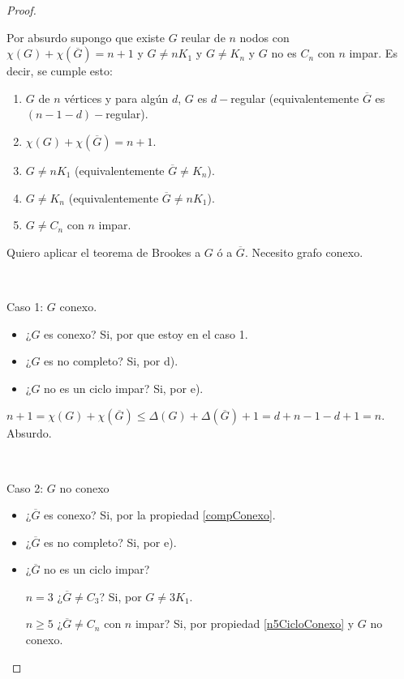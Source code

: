 \begin{proof}
	
	~

	Por absurdo supongo que existe $G$ reular de $n$ nodos con $\chi(G) + \chi(\overline{G}) = n + 1$ y $G \not= n K_1$ y $G \not= K_n$ y $G$ no es $C_n$ con $n$ impar. Es decir, se cumple esto:

	\begin{enumerate}[label=\alph*)]
		\item $G$ de $n$ vértices y para algún $d$, $G$ es $d-$regular (equivalentemente $\overline{G}$ es $(n - 1 - d)-$regular).
		\item $\chi(G) + \chi(\overline{G}) = n + 1$.
		\item $G \not= n K_1$ (equivalentemente $\overline{G} \not= K_n$).
		\item $G \not= K_n$ (equivalentemente $\overline{G} \not= n K_1$).
		\item $G \not= C_n$ con $n$ impar.
	\end{enumerate}

	Quiero aplicar el teorema de Brookes a $G$ ó a $\overline{G}$. Necesito grafo conexo.

	~

	Caso 1: $G$ conexo.

	\begin{itemize}
		\item ¿$G$ es conexo? Si, por que estoy en el caso 1.
		\item ¿$G$ es no completo? Si, por d).
		\item ¿$G$ no es un ciclo impar? Si, por e).
	\end{itemize}

	$n + 1 = \chi(G) + \chi(\overline{G}) \leq \Delta(G) + \Delta(\overline{G}) + 1 = d + n - 1 - d + 1 = n$. Absurdo.

	~

	Caso 2: $G$ no conexo

	\begin{itemize}
		\item ¿$\overline{G}$ es conexo? Si, por la propiedad \ref{compConexo}.
		\item ¿$\overline{G}$ es no completo? Si, por e).
		\item {
			¿$\overline{G}$ no es un ciclo impar?

			$n = 3$ ¿$\overline{G} \not= C_3$? Si, por $G \not= 3 K_1$.

			$n \geq 5$ ¿$\overline{G} \not= C_n$ con $n$ impar? Si, por propiedad \ref{n5CicloConexo} y $G$ no conexo.
		}
	\end{itemize}
\end{proof}